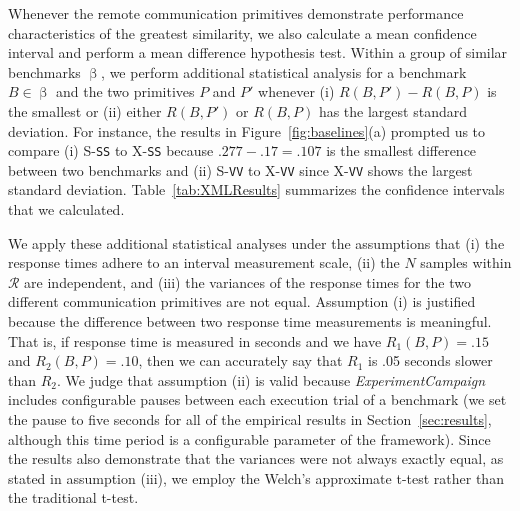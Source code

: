 \documentclass{sig-alternate}
\begin{document}
Whenever the remote communication primitives demonstrate performance
characteristics of the greatest similarity, we also calculate a mean
confidence interval and perform a mean difference hypothesis test.
Within a group of similar benchmarks $\upbeta$, we perform additional
statistical analysis for a benchmark $B \in \upbeta$ and the two
primitives $P$ and $P'$ whenever (i) $R(B,P') - R(B,P)$ is the
smallest or (ii) either $R(B,P')$ or $R(B,P)$ has the largest standard
deviation.  For instance, the results in Figure~\ref{fig:baselines}(a)
prompted us to compare (i) S-{\tt SS} to X-{\tt SS} because
$.277-.17=.107$ is the smallest difference between two benchmarks and
(ii) S-{\tt VV} to X-{\tt VV} since X-{\tt VV} shows the largest
standard deviation.  Table~\ref{tab:XMLResults} summarizes the
confidence intervals that we calculated.



We apply these additional statistical analyses under the assumptions
that (i) the response times adhere to an interval measurement scale,
(ii) the $N$ samples within $\mathcal{R}$ are independent, and (iii)
the variances of the response times for the two different
communication primitives are not equal.  Assumption (i) is justified
because the difference between two response time measurements is
meaningful. That is, if response time is measured in seconds and we
have $R_1(B,P) = .15$ and $R_2(B,P) = .10$, then we can accurately say
that $R_1$ is .05 seconds slower than $R_2$.  We judge that assumption
(ii) is valid because {\em ExperimentCampaign} includes configurable
pauses between each execution trial of a benchmark (we set the pause
to five seconds for all of the empirical results in
Section~\ref{sec:results}, although this time period is a configurable
parameter of the framework).  Since the results also demonstrate that
the variances were not always exactly equal, as stated in assumption
(iii), we employ the Welch's approximate t-test rather than the
traditional t-test.



\end{document}
